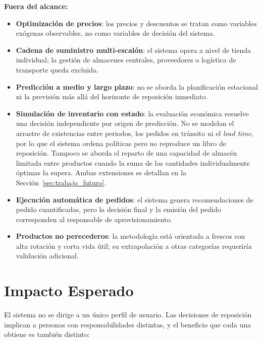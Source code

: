 \textbf{Fuera del alcance:}
\begin{itemize}
    \item \textbf{Optimización de precios}: los precios y descuentos se tratan como variables exógenas observables, no como variables de decisión del sistema.
    \item \textbf{Cadena de suministro multi-escalón}: el sistema opera a nivel de tienda individual; la gestión de almacenes centrales, proveedores o logística de transporte queda excluida.
    \item \textbf{Predicción a medio y largo plazo}: no se aborda la planificación estacional ni la previsión más allá del horizonte de reposición inmediato.
    \item \textbf{Simulación de inventario con estado}: la evaluación económica resuelve una
    decisión independiente por origen de predicción. No se modelan el arrastre de existencias entre
    periodos, los pedidos en tránsito ni el \textit{lead time}, por lo que el sistema ordena
    políticas pero no reproduce un libro de reposición. Tampoco se aborda el reparto de una
    capacidad de almacén limitada entre productos cuando la suma de las cantidades individualmente
    óptimas la supera. Ambas extensiones se detallan en la Sección~\ref{sec:trabajo_futuro}.
    \item \textbf{Ejecución automática de pedidos}: el sistema genera recomendaciones de pedido cuantificadas, pero la decisión final y la emisión del pedido corresponden al responsable de aprovisionamiento.
    \item \textbf{Productos no perecederos}: la metodología está orientada a frescos con alta rotación y corta vida útil; su extrapolación a otras categorías requeriría validación adicional.
\end{itemize}

\section{Impacto Esperado}
El sistema no se dirige a un único perfil de usuario. Las decisiones de reposición implican a
personas con responsabilidades distintas, y el beneficio que cada una obtiene es también distinto:


